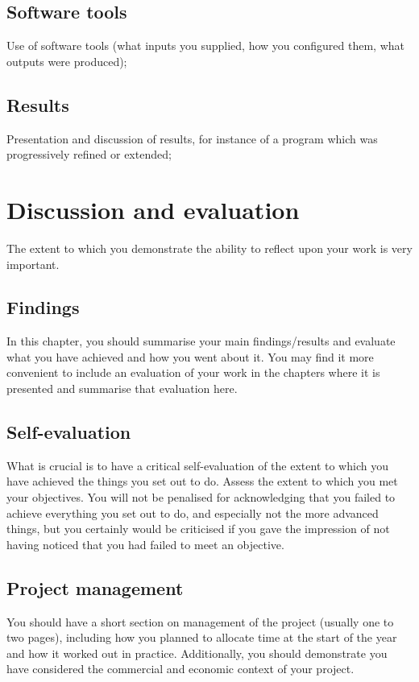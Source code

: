 \documentclass[a4paper, notitlepage, 11pt]{article}
\begin{document}
\subsection{Software tools}
 Use  of  software  tools  (what  inputs  you  supplied,  how  you  configured  them,  what 
outputs were produced);  

\subsection{Results}
Presentation  and  discussion  of  results,  for  instance  of  a  program  which 
was progressively refined or extended; 


\section{Discussion and evaluation}

The extent to which you demonstrate the ability to reflect upon your work is very important. 
\subsection{Findings}
In this chapter, you should summarise your main findings/results and evaluate what you have 
achieved and how you went about it. You may find it more convenient to include an evaluation 
of your work in the chapters where it is presented and summarise that evaluation here. 

\subsection{Self-evaluation}
What is 
crucial is to have a critical self-evaluation of the extent to which you have achieved the things 
you set out to do. Assess the extent to which you met your objectives. You will not be penalised 
for acknowledging that you failed to achieve everything you set out to do, and especially not 
the more advanced things, but you certainly would be criticised if you gave the impression of 
not having noticed that you had failed to meet an objective.  

\subsection{Project management}
You  should  have  a  short  section  on  management  of  the  project  (usually  one  to  two  pages), 
including how you planned  to allocate time at the start of the year and how it  worked out  in 
practice.  Additionally,  you  should  demonstrate  you  have  considered  the  commercial  and 
economic context of your project.  
\end{document}
